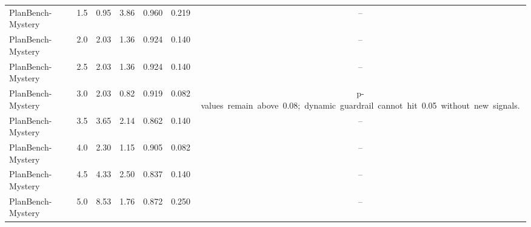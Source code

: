 \begin{tabular}{lcccccc}
PlanBench-Mystery & 1.5 & 0.95 & 3.86 & 0.960 & 0.219 & \multicolumn{1}{c}{--}\\
PlanBench-Mystery & 2.0 & 2.03 & 1.36 & 0.924 & 0.140 & \multicolumn{1}{c}{--}\\
PlanBench-Mystery & 2.5 & 2.03 & 1.36 & 0.924 & 0.140 & \multicolumn{1}{c}{--}\\
PlanBench-Mystery & 3.0 & 2.03 & 0.82 & 0.919 & 0.082 & \mbox{p-values remain above 0.08; dynamic guardrail cannot hit 0.05 without new signals.}\\
PlanBench-Mystery & 3.5 & 3.65 & 2.14 & 0.862 & 0.140 & \multicolumn{1}{c}{--}\\
PlanBench-Mystery & 4.0 & 2.30 & 1.15 & 0.905 & 0.082 & \multicolumn{1}{c}{--}\\
PlanBench-Mystery & 4.5 & 4.33 & 2.50 & 0.837 & 0.140 & \multicolumn{1}{c}{--}\\
PlanBench-Mystery & 5.0 & 8.53 & 1.76 & 0.872 & 0.250 & \multicolumn{1}{c}{--}\\
\bottomrule
\end{tabular}
